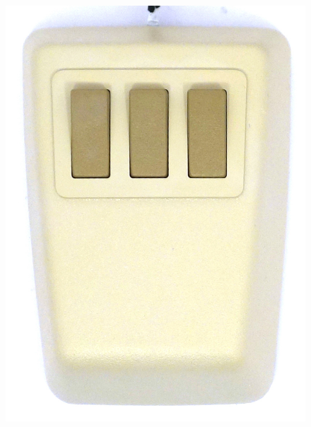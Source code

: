 \documentclass[11pt, a4paper]{article}
\begin{document}
\begin{figure}[h]
    \centering
    \includegraphics[scale=0.55]{1983_dec_vs10x_ea_mouse/top_60.jpg}

\end{figure}
\end{document}
